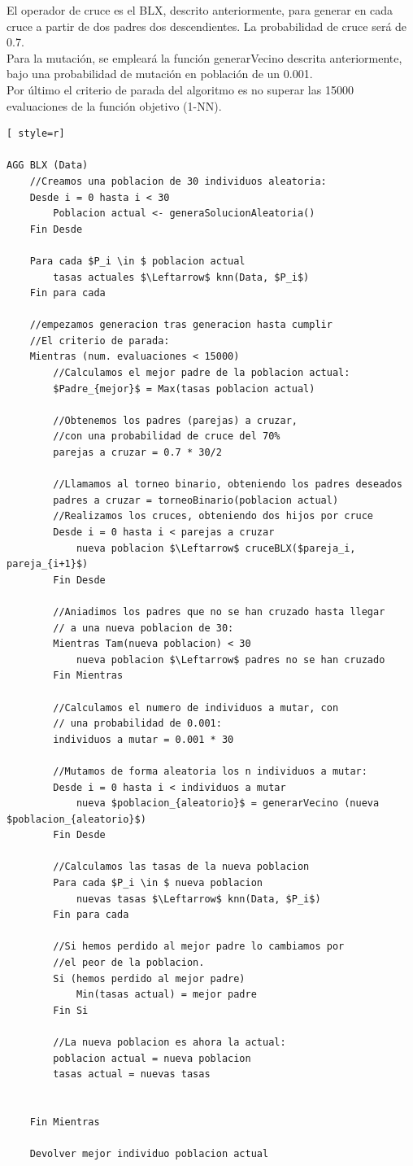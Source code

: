 El operador de cruce es el BLX, descrito anteriormente, para generar en cada cruce a partir de dos padres dos descendientes. La probabilidad de cruce será de 0.7.\\ 

Para la mutación, se empleará la función generarVecino descrita anteriormente, bajo una probabilidad de mutación en población de un 0.001.\\ 

Por último el criterio de parada del algoritmo es no superar las 15000 evaluaciones de la función objetivo (1-NN).

\begin{lstlisting}[ style=r]

AGG BLX (Data)
	//Creamos una poblacion de 30 individuos aleatoria:
	Desde i = 0 hasta i < 30
		Poblacion actual <- generaSolucionAleatoria()
	Fin Desde
	
	Para cada $P_i \in $ poblacion actual
		tasas actuales $\Leftarrow$ knn(Data, $P_i$)
	Fin para cada
	
	//empezamos generacion tras generacion hasta cumplir
	//El criterio de parada:
	Mientras (num. evaluaciones < 15000)
		//Calculamos el mejor padre de la poblacion actual:
		$Padre_{mejor}$ = Max(tasas poblacion actual)
		
		//Obtenemos los padres (parejas) a cruzar, 
		//con una probabilidad de cruce del 70%
		parejas a cruzar = 0.7 * 30/2
		
		//Llamamos al torneo binario, obteniendo los padres deseados
		padres a cruzar = torneoBinario(poblacion actual)
		//Realizamos los cruces, obteniendo dos hijos por cruce
		Desde i = 0 hasta i < parejas a cruzar
			nueva poblacion $\Leftarrow$ cruceBLX($pareja_i, pareja_{i+1}$)
		Fin Desde
		
		//Aniadimos los padres que no se han cruzado hasta llegar 
		// a una nueva poblacion de 30:
		Mientras Tam(nueva poblacion) < 30
			nueva poblacion $\Leftarrow$ padres no se han cruzado
		Fin Mientras
		
		//Calculamos el numero de individuos a mutar, con
		// una probabilidad de 0.001:
		individuos a mutar = 0.001 * 30
		
		//Mutamos de forma aleatoria los n individuos a mutar:
		Desde i = 0 hasta i < individuos a mutar
			nueva $poblacion_{aleatorio}$ = generarVecino (nueva $poblacion_{aleatorio}$)
		Fin Desde
		
		//Calculamos las tasas de la nueva poblacion
		Para cada $P_i \in $ nueva poblacion
			nuevas tasas $\Leftarrow$ knn(Data, $P_i$)
		Fin para cada
		
		//Si hemos perdido al mejor padre lo cambiamos por 
		//el peor de la poblacion.
		Si (hemos perdido al mejor padre)
			Min(tasas actual) = mejor padre
		Fin Si
		
		//La nueva poblacion es ahora la actual:
		poblacion actual = nueva poblacion
		tasas actual = nuevas tasas
	
	
	Fin Mientras
	
	Devolver mejor individuo poblacion actual
\end{lstlisting}


